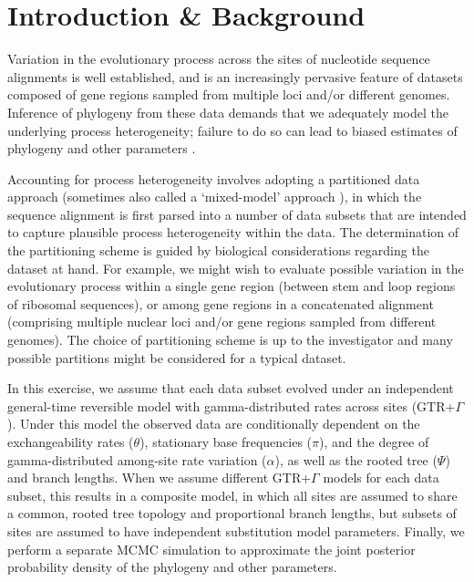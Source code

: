\section{Introduction \& Background}

Variation in the evolutionary process across the sites of nucleotide sequence alignments is well established, and is an increasingly pervasive feature of datasets composed of gene regions sampled from multiple loci and/or different genomes.
Inference of phylogeny from these data demands that we adequately model the underlying process heterogeneity; failure to do so can lead to biased estimates of phylogeny and other parameters \citep{Brown2007}.

Accounting for process heterogeneity involves adopting a partitioned data approach (sometimes also called a `mixed-model' approach \citep{Ronquist2003}), in which the sequence alignment is first parsed into a number of data subsets that are intended to capture plausible process heterogeneity within the data.
The determination of the partitioning scheme is guided by biological considerations regarding the dataset at hand.
For example, we might wish to evaluate possible variation in the evolutionary process within a single gene region (\EG between stem and loop regions of ribosomal sequences), or among gene regions in a concatenated alignment (\EG comprising multiple nuclear loci and/or gene regions sampled from different genomes).
The choice of partitioning scheme is up to the investigator and many possible partitions might be considered for a typical dataset.

In this exercise, we assume that each data subset evolved under an independent general-time reversible model with gamma-distributed rates across sites (GTR+$\Gamma$). 
Under this model the observed data are conditionally dependent on the exchangeability rates ($\theta$), stationary base frequencies ($\pi$), and the degree of gamma-distributed among-site rate variation ($\alpha$), as well as the rooted tree ($\Psi$) and branch lengths.
When we assume different GTR+$\Gamma$ models for each data subset, this results in a composite model, in which all sites are assumed to share a common, rooted tree topology and proportional branch lengths, but subsets of sites are assumed to have independent substitution model parameters.
Finally, we perform a separate MCMC simulation to approximate the joint posterior probability density of the phylogeny and other parameters. 

